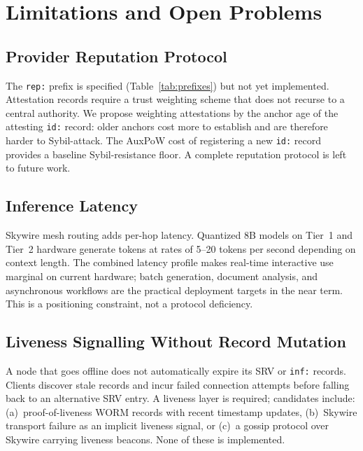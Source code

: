 \documentclass[11pt,a4paper]{article}
\theoremstyle{definition}
\begin{document}
\section{Limitations and Open Problems}
\label{sec:limitations}

\subsection{Provider Reputation Protocol}
\label{sec:rep}

The \texttt{rep:} prefix is specified (Table~\ref{tab:prefixes}) but not yet
implemented.  Attestation records require a trust weighting scheme that
does not recurse to a central authority.  We propose weighting attestations
by the anchor age of the attesting \texttt{id:} record: older anchors cost
more to establish and are therefore harder to Sybil-attack.  The AuxPoW
cost of registering a new \texttt{id:} record provides a baseline
Sybil-resistance floor.  A complete reputation protocol is left to future
work.

\subsection{Inference Latency}

Skywire mesh routing adds per-hop latency.  Quantized 8B models on Tier~1
and Tier~2 hardware generate tokens at rates of 5--20 tokens per second
depending on context length.  The combined latency profile makes real-time
interactive use marginal on current hardware; batch generation, document
analysis, and asynchronous workflows are the practical deployment targets
in the near term.  This is a positioning constraint, not a protocol deficiency.

\subsection{Liveness Signalling Without Record Mutation}

A node that goes offline does not automatically expire its SRV or
\texttt{inf:} records.  Clients discover stale records and incur failed
connection attempts before falling back to an alternative SRV entry.
A liveness layer is required; candidates include:
(a)~proof-of-liveness WORM records with recent timestamp updates,
(b)~Skywire transport failure as an implicit liveness signal, or
(c)~a gossip protocol over Skywire carrying liveness beacons.
None of these is implemented.
\end{document}
